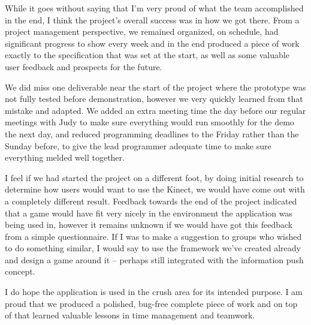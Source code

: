 
While it goes without saying that I'm very proud of what the team accomplished in the end, I think the project's overall success was in how we got there. From a project management perspective, we remained organized, on schedule, had significant progress to show every week and in the end produced a piece of work exactly to the specification that was set at the start, as well as some valuable user feedback and prospects for the future.

We did miss one deliverable near the start of the project where the prototype was not fully tested before demonstration, however we very quickly learned from that mistake and adapted. We added an extra meeting time the day before our regular meetings with Judy to make sure everything would run smoothly for the demo the next day, and reduced programming deadlines to the Friday rather than the Sunday before, to give the lead programmer adequate time to make sure everything melded well together.

I feel if we had started the project on a different foot, by doing initial research to determine how users would want to use the Kinect, we would have come out with a completely different result. Feedback towards the end of the project indicated that a game would have fit very nicely in the environment the application was being used in, however it remains unknown if we would have got this feedback from a simple questionnaire. If I was to make a suggestion to groups who wished to do something similar, I would say to use the framework we've created already and design a game around it -- perhaps still integrated with the information push concept.

I do hope the application is used in the crush area for its intended purpose. I am proud that we produced a polished, bug-free complete piece of work and on top of that learned valuable lessons in time management and teamwork.

